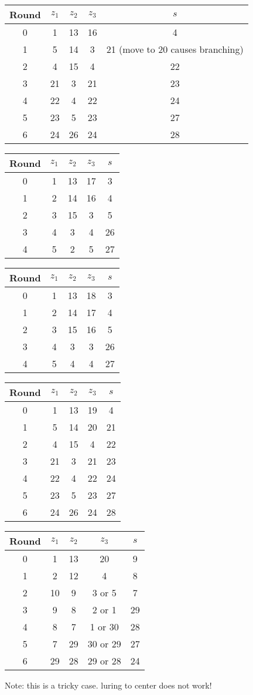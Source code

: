 \begin{tabular}{c | c | c | c | c }
Round & $z_1$ & $z_2$ & $z_3$ & $s$ \\
\hline
0 & 1 & 13 & 16 & 4 \\
1 & 5 & 14 & 3 & 21 (move to 20 causes branching) \\
2 & 4 & 15 & 4 & 22 \\
3 & 21 & 3 & 21 & 23 \\
4 & 22 & 4 & 22 & 24 \\
5 & 23 & 5 & 23 & 27 \\
6 & 24 & 26 & 24 & 28
\end{tabular}

\begin{tabular}{c | c | c | c | c }
Round & $z_1$ & $z_2$ & $z_3$ & $s$ \\
\hline
0 & 1 & 13 & 17 & 3 \\
1 & 2 & 14 & 16 & 4 \\
2 & 3 & 15 & 3 & 5 \\
3 & 4 & 3 & 4 & 26 \\
4 & 5 & 2 & 5 & 27
\end{tabular}

\begin{tabular}{c | c | c | c | c }
Round & $z_1$ & $z_2$ & $z_3$ & $s$ \\
\hline
0 & 1 & 13 & 18 & 3 \\
1 & 2 & 14 & 17 & 4 \\
2 & 3 & 15 & 16 & 5 \\
3 & 4 & 3 & 3 & 26 \\
4 & 5 & 4 & 4 & 27
\end{tabular}

\begin{tabular}{c | c | c | c | c }
Round & $z_1$ & $z_2$ & $z_3$ & $s$ \\
\hline
0 & 1 & 13 & 19 & 4 \\
1 & 5 & 14 & 20 & 21 \\
2 & 4 & 15 & 4 & 22 \\
3 & 21 & 3 & 21 & 23 \\
4 & 22 & 4 & 22 & 24 \\
5 & 23 & 5 & 23 & 27 \\
6 & 24 & 26 & 24 & 28
\end{tabular}

\begin{tabular}{c | c | c | c | c }
Round & $z_1$ & $z_2$ & $z_3$ & $s$ \\
\hline
0 & 1 & 13 & 20 & 9 \\
1 & 2 & 12 & 4 & 8 \\
2 & 10 & 9 & 3 or 5 & 7 \\
3 & 9 & 8 & 2 or 1 & 29 \\
4 & 8 & 7 & 1 or 30 & 28 \\
5 & 7 & 29 & 30 or 29 & 27 \\
6 & 29 & 28 & 29 or 28 & 24
\end{tabular}
Note: this is a tricky case. luring to center does not work!

